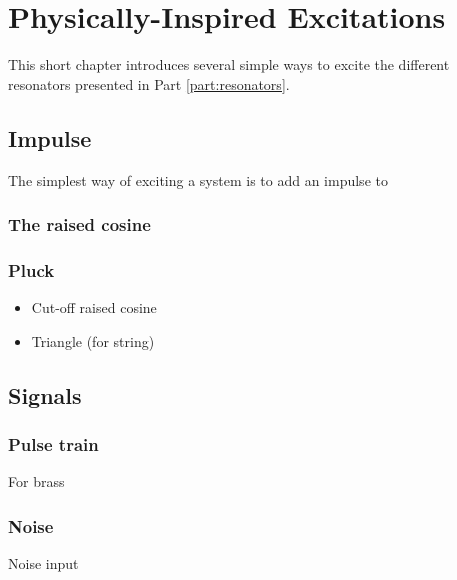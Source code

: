 \chapter{Physically-Inspired Excitations}\label{ch:physInspExcitations}
This short chapter introduces several simple ways to excite the different resonators presented in Part \ref{part:resonators}.
\section{Impulse}
The simplest way of exciting a system is to add an impulse to 
\subsection{The raised cosine}


\subsection{Pluck}
\begin{itemize}
    \item Cut-off raised cosine
    \item Triangle (for string)
\end{itemize}

\section{Signals}
\subsection{Pulse train}
For brass

\subsection{Noise}
Noise input